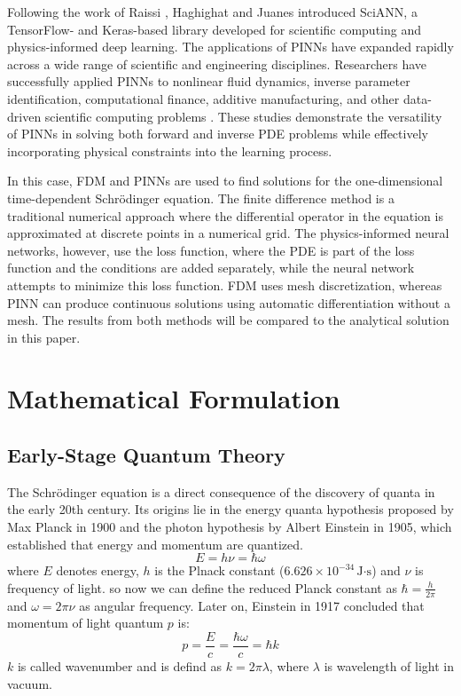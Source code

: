 \documentclass[11pt]{article}
\begin{document}
Following the work of Raissi , Haghighat and Juanes \cite{haghighatSciANNKerasTensorflow2021} introduced SciANN, a TensorFlow- and Keras-based library developed for scientific computing and physics-informed deep learning. The applications of PINNs have expanded rapidly across a wide range of scientific and engineering disciplines. Researchers have successfully applied PINNs to nonlinear fluid dynamics, inverse parameter 
identification, computational finance, additive manufacturing, and other data-driven scientific computing problems \cite{zhuMachineLearningMetal2020,xuExploreMissingFlow2021,taniosPhysicsInformedNeural2021,savovicComparativeStudyExplicit2023a}. These studies demonstrate the versatility of PINNs in solving both forward and inverse PDE problems while effectively incorporating physical constraints into the learning process.

In this case, FDM and PINNs are used to find solutions for the one-dimensional time-dependent Schrödinger equation. The finite difference method is a traditional numerical approach where the differential operator in the equation is approximated at discrete points in a numerical grid. The physics-informed neural networks, however, use the loss function, where the PDE is part of the loss function and the conditions are added separately, while the neural network attempts to minimize this loss function. FDM uses mesh discretization, whereas PINN can produce continuous solutions using automatic differentiation without a mesh. The results from both methods will be compared to the analytical solution in this paper.



\section{Mathematical Formulation}
\subsection{Early-Stage Quantum Theory}
The Schrödinger equation is a direct consequence of the discovery of quanta in the early 20th century. Its origins lie in the energy quanta hypothesis proposed by Max Planck in 1900 and the photon hypothesis by Albert Einstein in 1905, which established that energy and momentum are quantized.
\begin{equation}  \label{eq:1905}
	E = h \nu = \hbar \omega
\end{equation} 
where $E$ denotes energy, $h$ is the Plnack constant ($6.626 \times 10^{-34} \,\text{J·s}$) and $\nu$ is frequency of light. so now we can define the reduced Planck constant as $\hbar = \frac{h}{2 \pi}$ and $\omega = 2 \pi \nu$ as angular frequency. 
Later on, Einstein in 1917 concluded that momentum of light quantum $p$ is:
\begin{equation}  \label{eq:1917}
	 p = \frac{E}{c} = \frac{\hbar \omega}{c} = \hbar k 
\end{equation}
$k$ is called wavenumber and is defind as $ k = 2 \pi \lambda$, where $\lambda$ is wavelength of light in vacuum.
\end{document}
